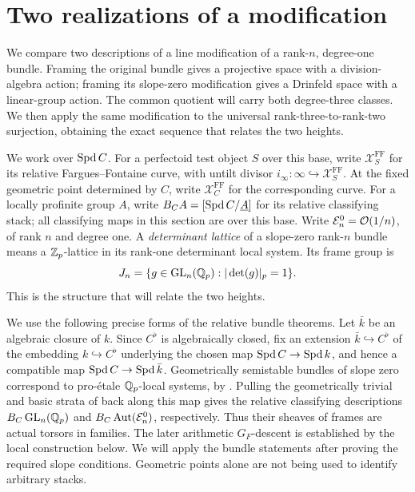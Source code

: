 \section{Two realizations of a modification}\label{sec:modifications}

We compare two descriptions of a line modification of a rank-$n$,
degree-one bundle. Framing the original bundle gives a projective
space with a division-algebra action; framing its slope-zero
modification gives a Drinfeld space with a linear-group action.
The common quotient will carry both degree-three classes. We then
apply the same modification to the universal rank-three-to-rank-two
surjection, obtaining the exact sequence that relates the two heights.

We work over $\operatorname{Spd} C$.  For a perfectoid test object $S$ over this
base, write $\mathcal X_S^{\mathrm{FF}}$ for its relative
Fargues--Fontaine curve, with untilt divisor
$i_\infty:\infty\hookrightarrow\mathcal X_S^{\mathrm{FF}}$.
At the fixed geometric point determined by $C$, write
$\mathcal X_C^{\mathrm{FF}}$ for the corresponding curve.
For a locally profinite group $A$, write
$B_CA=[\operatorname{Spd} C/\underline A]$ for its relative classifying stack;
all classifying maps in this section are over this base.
Write $\mathcal E_n^0=\mathcal O(1/n)$, of rank $n$ and degree one.
A \emph{determinant lattice} of a slope-zero rank-$n$ bundle means a
$\mathbb Z_p$-lattice in its rank-one determinant local system.
Its frame group is
\[
 J_n=\{g\in\operatorname{GL}_n(\mathbb Q_p):|\det(g)|_p=1\}.
\]
This is the structure that will relate the two heights.

We use the following precise forms of the relative bundle theorems.
Let $\bar k$ be an algebraic closure of $k$.  Since $C^\flat$ is
algebraically closed, fix an extension $\bar k\hookrightarrow C^\flat$
of the embedding $k\hookrightarrow C^\flat$ underlying the chosen map
$\operatorname{Spd} C\to\operatorname{Spd} k$, and hence a compatible map
$\operatorname{Spd} C\to\operatorname{Spd}\bar k$.  Geometrically semistable bundles of slope zero
correspond to pro-\'etale $\mathbb Q_p$-local systems, by
\cite[Theorem II.2.19 and Corollary II.2.20]{FS}.
Pulling the geometrically trivial and basic strata of
\cite[Theorems III.2.4 and III.4.5]{FS} back along this map gives the
relative classifying descriptions $B_C\operatorname{GL}_n(\mathbb Q_p)$ and
$B_C\operatorname{Aut}(\mathcal E_n^0)$, respectively.
Thus their sheaves of frames are actual torsors in families.
The later arithmetic $G_F$-descent is established by the local
construction below.  We will apply the bundle statements after proving
the required slope conditions.  Geometric points alone are not being
used to identify arbitrary stacks.

